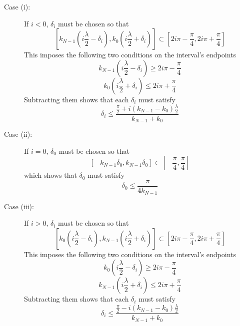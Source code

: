 \begin{description}
\item[Case (i):] If $i<0$, $\delta_i$ must be chosen so that
\begin{equation}
\left[k_{N-1}\left(i\frac{\lambda}{2}-\delta_i\right), 
      k_0\left(i\frac{\lambda}{2}+\delta_i\right)\right]
\subset
\left[2i\pi-\frac{\pi}{4}, 2i\pi+\frac{\pi}{4}\right]
\end{equation}
This imposes the following two conditions on the interval's endpoints
\begin{equation}
k_{N-1}\left(i\frac{\lambda}{2}-\delta_i\right)\geq 2i\pi-\frac{\pi}{4}
\end{equation}
\begin{equation}
k_0\left(i\frac{\lambda}{2}+\delta_i\right)\leq 2i\pi+\frac{\pi}{4}
\end{equation}
Subtracting them shows that each $\delta_i$ must satisfy
\begin{equation}
\delta_i\leq\frac{\frac{\pi}{2}+i(k_{N-1}-k_0)\frac{\lambda}{2}}{k_{N-1}+k_0}
\end{equation}

\item[Case (ii):] If $i=0$, $\delta_0$ must be chosen so that
\begin{equation}
\left[-k_{N-1}\delta_0,k_{N-1}\delta_0\right]
\subset
\left[-\frac{\pi}{4},\frac{\pi}{4}\right]
\end{equation}
which shows that $\delta_0$ must satisfy
\begin{equation}
\delta_0\leq\frac{\pi}{4k_{N-1}}
\end{equation}

\item[Case (iii):] If $i>0$, $\delta_i$ must be chosen so that
\begin{equation}
\left[k_0\left(i\frac{\lambda}{2}-\delta_i\right), 
      k_{N-1}\left(i\frac{\lambda}{2}+\delta_i\right)\right]
\subset
\left[2i\pi-\frac{\pi}{4}, 2i\pi+\frac{\pi}{4}\right]
\end{equation}
This imposes the following two conditions on the interval's endpoints
\begin{equation}
k_0\left(i\frac{\lambda}{2}-\delta_i\right)\geq 2i\pi-\frac{\pi}{4}
\end{equation}
\begin{equation}
k_{N-1}\left(i\frac{\lambda}{2}+\delta_i\right)\leq 2i\pi+\frac{\pi}{4}
\end{equation}
Subtracting them shows that each $\delta_i$ must satisfy
\begin{equation}
\delta_i\leq\frac{\frac{\pi}{2}-i(k_{N-1}-k_0)\frac{\lambda}{2}}{k_{N-1}+k_0}
\end{equation}
\end{description}

